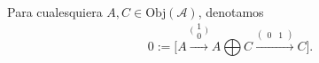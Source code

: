 \documentclass[preview]{standalone}
\begin{document}
\begin{center}
Para cualesquiera $A,C\in\text{Obj}(\mathscr{A})$, denotamos $$0:= \bigg[ A \xrightarrow{\big(\begin{smallmatrix}1 \\ 0\end{smallmatrix}\big)} A\bigoplus C \xrightarrow{(\begin{smallmatrix} 0 &1 \end{smallmatrix})} C \bigg].$$
\end{center}
\end{document}

